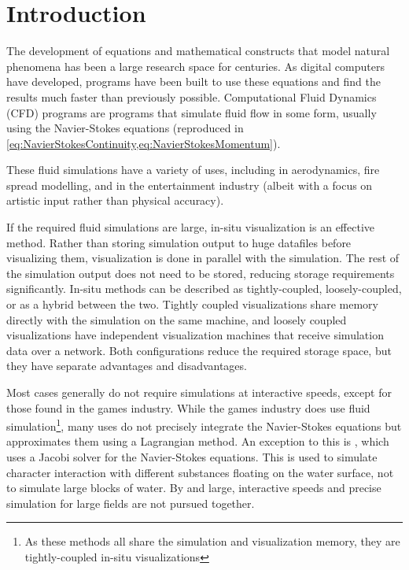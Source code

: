 
\chapter{Introduction}
\label{sec:Introduction} 
The development of equations and mathematical constructs that model natural phenomena has been a large research space for centuries.
As digital computers have developed, programs have been built to use these equations and find the results much faster than previously possible\cite{AtomicHeritageFoundationComputingProject}.
Computational Fluid Dynamics (CFD) programs are programs that simulate fluid flow in some form, usually using the Navier-Stokes equations (reproduced in \cref{eq:NavierStokesContinuity,eq:NavierStokesMomentum}).

These fluid simulations have a variety of uses,
including in aerodynamics\cite{jameson2002},%
fire spread modelling\cite{Sullivan_2009},
and in the entertainment industry (albeit with a focus on artistic input rather than physical accuracy\cite{article:FluidDynamicsOnBigScreen}).

If the required fluid simulations are large, in-situ visualization is an effective method.
Rather than storing simulation output to huge datafiles before visualizing them, visualization is done in parallel with the simulation\cite{kress2017situ}.
The rest of the simulation output does not need to be stored, reducing storage requirements significantly.
In-situ methods can be described as tightly-coupled, loosely-coupled, or as a hybrid between the two.
Tightly coupled visualizations share memory directly with the simulation on the same machine, and loosely coupled visualizations have independent visualization machines that receive simulation data over a network.
Both configurations reduce the required storage space, but they have separate advantages and disadvantages.

Most cases generally do not require simulations at interactive speeds, except for those found in the games industry.
While the games industry does use fluid simulation\cite{paper:GameFluidSummary:medveckyreal}\footnote{As these methods all share the simulation and visualization memory, they are tightly-coupled in-situ visualizations}, many uses do not precisely integrate the Navier-Stokes equations but approximates them \cite{paper:StableFluids:10.1145/311535.311548} using a Lagrangian method.
An exception to this is \cite{presentation:RealtimeFluidSimTombRaider}, which uses a Jacobi solver for the Navier-Stokes equations. This is used to simulate character interaction with different substances floating on the water surface\cite{presentation:RealtimeFluidSimTombRaider}, not to simulate large blocks of water.
By and large, interactive speeds and precise simulation for large fields are not pursued together.


